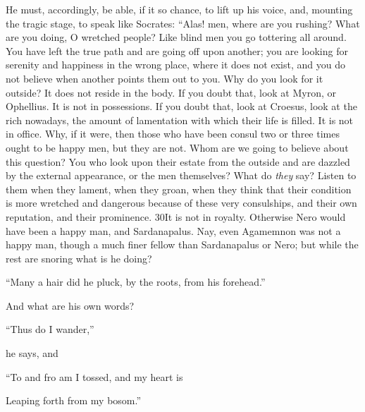 He must, accordingly, be able, if it so chance, to lift up his voice, and, mounting the tragic stage, to speak like Socrates: ``Alas! men, where are you rushing? What are you doing, O wretched people? Like blind men you go tottering all around. You have left the true path and are going off upon another; you are looking for serenity and happiness in the wrong place, where it does not exist, and you do not believe when another points them out to you. Why do you look for it outside? It does not reside in the body. If you doubt that, look at Myron, or Ophellius. It is not in possessions. If you doubt that, look at Croesus, look at the rich nowadays, the amount of lamentation with which their life is filled. It is not in office. Why, if it were, then those who have been consul two or three times ought to be happy men, but they are not. Whom are we going to believe about this question? You who look upon their estate from the outside and are dazzled by the external appearance, or the men themselves? What do \emph{they} say? Listen to them when they lament, when they groan, when they think that their condition is more wretched and dangerous because of these very consulships, and their own reputation, and their prominence. 30It is not in royalty. Otherwise Nero would have been a happy man, and Sardanapalus. Nay, even Agamemnon was not a happy man, though a much finer fellow than Sardanapalus or Nero; but while the rest are snoring what is he doing?

``Many a hair did he pluck, by the roots, from his forehead.''

And what are his own words?

``Thus do I wander,''

he says, and

``To and fro am I tossed, and my heart is

Leaping forth from my bosom.''

